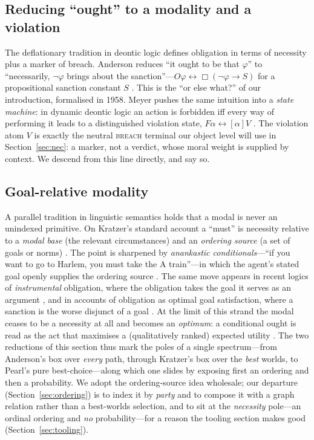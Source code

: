 \subsection{Reducing ``ought'' to a modality and a violation}
The deflationary tradition in deontic logic defines obligation in terms of necessity plus
a marker of breach. Anderson reduces ``it ought to be that $\varphi$'' to ``necessarily,
$\neg\varphi$ brings about the sanction''---$O\varphi \leftrightarrow \Box(\neg\varphi \to
S)$ for a propositional sanction constant $S$ . This is the
``or else what?'' of our introduction, formalised in 1958. Meyer pushes the same intuition
into a \emph{state machine}: in dynamic deontic logic an action is forbidden iff every way
of performing it leads to a distinguished violation state, $F\alpha \leftrightarrow
[\alpha]V$ . The violation atom $V$ is exactly the neutral
\textsc{breach} terminal our object level will use in Section~\ref{sec:nec}: a marker, not
a verdict, whose moral weight is supplied by context. We descend from this line directly,
and say so.

\subsection{Goal-relative modality}
A parallel tradition in linguistic semantics holds that a modal is never an unindexed
primitive. On Kratzer's standard account a ``must'' is necessity relative to a
\emph{modal base} (the relevant circumstances) and an \emph{ordering source} (a set of
goals or norms) . The point is sharpened by \emph{anankastic
conditionals}---``if you want to go to Harlem, you must take the A train''---in which the
agent's stated goal openly supplies the ordering source . The same move appears in recent logics of \emph{instrumental}
obligation, where the obligation takes the goal it serves as an argument
, and in accounts of obligation as optimal goal satisfaction, where a
sanction is the worse disjunct of a goal . At the limit of this
strand the modal ceases to be a necessity at all and becomes an \emph{optimum}: a
conditional ought is read as the act that maximises a (qualitatively ranked) expected
utility . The two reductions of this section thus mark the poles of a single
spectrum---from Anderson's box over \emph{every} path, through Kratzer's box over the
\emph{best} worlds, to Pearl's pure best-choice---along which one slides by exposing first an
ordering and then a probability. We adopt the
ordering-source idea wholesale; our departure (Section~\ref{sec:ordering}) is to index it
by \emph{party} and to compose it with a graph relation rather than a best-worlds selection,
and to sit at the \emph{necessity} pole---an ordinal ordering and \emph{no} probability---for
a reason the tooling section makes good (Section~\ref{sec:tooling}).

